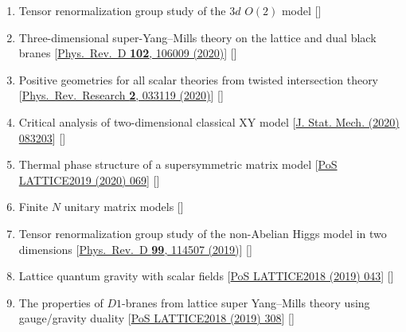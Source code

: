 \begin{enumerate}
 \item Tensor renormalization group study of the $3d$ $O(2)$ model [\texttt{\textbf{}}] 
 \item Three-dimensional super-Yang--Mills theory on the lattice and dual black branes [\href{https://journals.aps.org/prd/abstract/10.1103/PhysRevD.102.106009}{Phys.\ Rev.\ D {\bf 102}, 106009 (2020)}] [\textbf{\texttt{}}] 
 \item Positive geometries for all scalar theories from twisted intersection theory [\href{https://journals.aps.org/prresearch/abstract/10.1103/PhysRevResearch.2.033119}{Phys.\ Rev.\ Research {\bf 2}, 033119 (2020)}] [\texttt{\textbf{}}] 
  \item Critical analysis of two-dimensional classical XY model [\href{https://iopscience.iop.org/article/10.1088/1742-5468/aba686/pdf}{J. Stat. Mech. (2020) 083203}] [\texttt{\textbf{}}] 
 \item Thermal phase structure of a supersymmetric matrix model [\href{https://pos.sissa.it/363/069}{PoS LATTICE2019 (2020) 069}] [\texttt{\textbf{}}] %
 \item  Finite $N$ unitary matrix models [\textbf{\texttt{}}] 
  \item Tensor renormalization group study of the non-Abelian Higgs model in two dimensions [\href{https://journals.aps.org/prd/abstract/10.1103/PhysRevD.99.114507}{Phys.\ Rev.\ D {\bf 99}, 114507 (2019)}] [\texttt{\textbf{}}] 
 \item  Lattice quantum gravity with scalar fields [\href{https://pos.sissa.it/334/043}{PoS LATTICE2018 (2019) 043}] [\texttt{\textbf{}}] %
  \item  The properties of $D1$-branes from lattice super Yang--Mills theory using gauge/gravity duality [\href{https://pos.sissa.it/334/308}{PoS LATTICE2018 (2019) 308}]   [\texttt{\textbf{}}] %

\end{enumerate}
